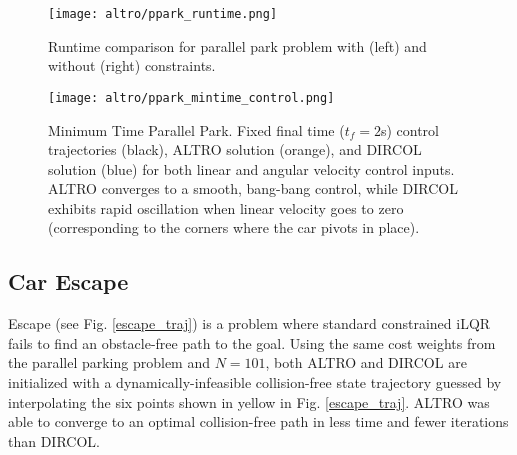 \documentclass[../root.tex]{subfiles}
\begin{document}
   \begin{figure}[t]
      \centering
      \texttt{[image: altro/ppark\_runtime.png]}
      \caption{Runtime comparison for parallel park problem with (left) and
      without (right) constraints.}
      \label{ppark_runtime}
   \end{figure}
   
   \begin{figure}[t]
      \centering
      \texttt{[image: altro/ppark\_mintime\_control.png]}
      \caption{Minimum Time Parallel Park. Fixed final time ($t_f = 2$s)
      control trajectories (black), ALTRO solution (orange), and DIRCOL
      solution (blue) for both linear and angular velocity control inputs.
      ALTRO converges to a smooth, bang-bang control, while DIRCOL exhibits
      rapid oscillation when linear velocity goes to zero (corresponding to
      the corners where the car pivots in place).}
      \label{ppark_mintime_controls}
   \end{figure}
   

\subsection{Car Escape}
    Escape (see Fig. \ref{escape_traj}) is a problem where standard
    constrained iLQR fails to find an obstacle-free path to the goal. Using
    the same cost weights from the parallel parking problem and $N=101$, both
    ALTRO and DIRCOL are initialized with a dynamically-infeasible
    collision-free state trajectory guessed by interpolating the six points
    shown in yellow in Fig. \ref{escape_traj}. ALTRO was able to converge to
    an optimal collision-free path in less time and fewer iterations than
    DIRCOL.
    
\end{document}

